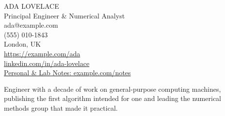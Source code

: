 \documentclass[10pt]{article}
\begin{document}
    \begin{center}
      {\fontsize{\sizeone}{\sizeone}\fontspec[Path = fonts/,LetterSpace=15]{\mtregular} ADA LOVELACE}
      \\
      \vspace{2mm}
      \vspace{2mm}
{\fontsize{1.1em}{1.1em}\fontspec[Path = fonts/]{\ctitalic} Principal Engineer \& Numerical Analyst}\\
      {\fontsize{1em}{1em}\fontspec[Path = fonts/]{\mtlight} ada@example.com \\
(555) 010-1843 \\
London, UK \\
\href{https://example.com/ada}{https://example.\allowbreak{}com/\allowbreak{}ada} \\
\href{https://linkedin.com/in/ada-lovelace}{linkedin.\allowbreak{}com/\allowbreak{}in/\allowbreak{}ada-\allowbreak{}lovelace} \\
\href{https://example.com/notes}{Personal \& Lab Notes: example.\allowbreak{}com/\allowbreak{}notes}}
      \end{center}
      
\vspace{2mm}
Engineer with a decade of work on general-purpose computing machines, publishing the first algorithm intended for one and leading the numerical methods group that made it practical.\par
\end{document}
